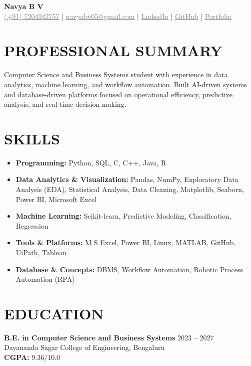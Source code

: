 \documentclass[10pt,a4paper]{article}
\begin{document}
\newpage

\begin{center}
{\Huge \textbf{Navya B V}}\\[0.5em]

\small
\href{tel:+917204942757}{\textcolor{gray}{(+91) 7204942757}} \quad | \quad
\href{mailto:navyabv05@gmail.com}{\textcolor{gray}{navyabv05@gmail.com}} \quad | \quad
\href{https://www.linkedin.com/in/navya-bv-1008avy005/}{\textcolor{gray}{LinkedIn}} \quad | \quad
\href{https://github.com/Navya-1008}{\textcolor{gray}{GitHub}} \quad | \quad
\href{https://navya-bv-portfolio.vercel.app}{\textcolor{gray}{Portfolio}}
\end{center}

\section*{PROFESSIONAL SUMMARY}
Computer Science and Business Systems student with experience in data analytics, machine learning, and workflow automation. Built AI-driven systems and database-driven platforms focused on operational efficiency, predictive analysis, and real-time decision-making.

\section*{SKILLS}
\begin{itemize}[leftmargin=*]
    \item \textbf{Programming:} Python, SQL, C, C++, Java, R
    \item \textbf{Data Analytics \& Visualization:} Pandas, NumPy, Exploratory Data Analysis (EDA), Statistical Analysis, Data Cleaning, Matplotlib, Seaborn, Power BI, Microsoft Excel
    \item \textbf{Machine Learning:} Scikit-learn, Predictive Modeling, Classification, Regression
    \item \textbf{Tools \& Platforms:} M S Excel, Power BI, Linux, MATLAB, GitHub, UiPath, Tableau
    \item \textbf{Database \& Concepts:} DBMS, Workflow Automation, Robotic Process Automation (RPA)
\end{itemize}
\section*{EDUCATION}
\textbf{B.E. in Computer Science and Business Systems} \hfill 2023 -- 2027 \\
Dayananda Sagar College of Engineering, Bengaluru \\
\textbf{CGPA:} 9.36/10.0
\end{document}
